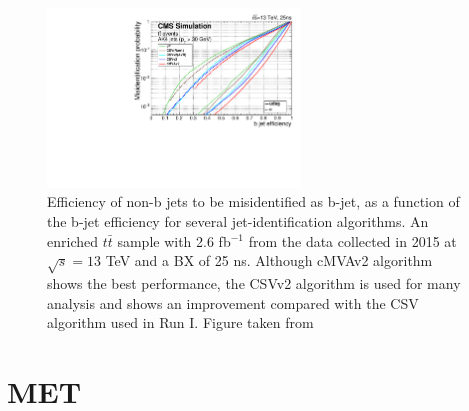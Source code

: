 \begin{figure}[ht]%
  \begin{center}
    \includegraphics[width=0.6\textwidth]{figuras/Chapter3/bjet_performance_algos.pdf}
    \caption{Efficiency of non-b jets to be misidentified as b-jet, as a function of the b-jet efficiency 
	     for several jet-identification algorithms. An enriched $t\bar{t}$ sample with 2.6 fb$^{-1}$ 
	     from the data collected in 2015 at $\sqrt{s}=13$ TeV and a BX of 25 ns. Although cMVAv2 algorithm 
             shows the best performance, the CSVv2 algorithm is used for many analysis and shows 
             an improvement compared with the CSV algorithm used in Run I. Figure taken from \cite{CMS:2016kkf}}
    \label{fig:bjetRun1vsRun2}
  \end{center}
\end{figure}

\section{MET}
\label{sec:MET}


